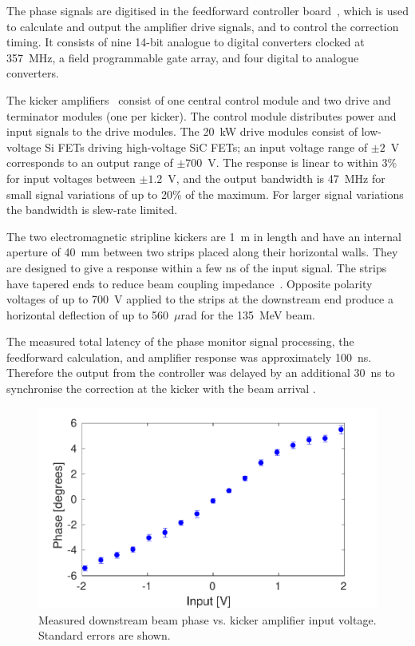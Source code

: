 \documentclass[%
 reprint,
 superscriptaddress,
 amsmath,
 amssymb,
 prl,
]{revtex4-1}
\begin{document}
The phase signals are digitised  in the feedforward controller
board~\cite{RobertsThesis}, which is used to calculate and output the amplifier 
drive signals, and to  control the correction timing. It consists of nine 
14-bit analogue to digital converters clocked at 357~MHz, a field programmable 
gate array, and four digital to analogue converters. 

The kicker amplifiers~\cite{RobertsThesis} consist of one central control 
module and two drive and terminator modules (one per kicker). The control 
module distributes power and input signals to the 
drive modules. The 20~kW drive modules consist of low-voltage Si FETs driving 
high-voltage SiC FETs; an input voltage range of \(\pm2\)~V corresponds to an 
output range of \(\pm700\)~V. The response is linear to within 3\% for input 
voltages between \(\pm1.2\)~V, and the output bandwidth is 47~MHz for small 
signal variations of up to 20\% of the maximum. For larger signal variations 
the bandwidth is slew-rate limited.

The two electromagnetic stripline kickers are 1~m in length 
and have an internal aperture of 40~mm between two strips placed along their 
horizontal walls. They are designed to give a response within a few ns of the 
input signal. The strips have tapered ends to reduce beam coupling 
impedance~\cite{kickerIPAC11}. 
Opposite polarity voltages of up to 700~V applied to the 
strips at the downstream end produce a horizontal deflection of up to 
560~\(\mu\)rad for the 135~MeV beam.

The measured total latency of the phase monitor signal processing, the 
feedforward calculation, and amplifier response was approximately 100~ns. 
Therefore the output from the controller was delayed by an additional 30~ns to 
synchronise the correction at the kicker with the beam arrival 
\cite{RobertsThesis}.

\begin{figure}
	\includegraphics[width=\columnwidth]{figs/corrRange}
	\caption{\label{fig:corrRange}Measured downstream beam phase vs. kicker 
	amplifier input voltage. Standard errors are shown.}
\end{figure}
\end{document}
